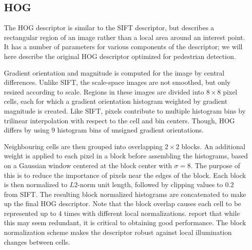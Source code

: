 \documentclass[thesis.tex]{subfiles}
\begin{document}
\subsection{HOG}
\label{sec:hog}

The HOG descriptor is similar to the SIFT descriptor, but describes a rectangular region of an image rather than a local area around an interest point. It has a number of parameters for various components of the descriptor; we will here describe the original HOG descriptor optimized for pedestrian detection.

Gradient orientation and magnitude is computed for the image by central differences. Unlike SIFT, the scale-space images are not smoothed, but only resized according to scale. Regions in these images are divided into $8 \times 8$ pixel cells, each for which a gradient orientation histogram weighted by gradient magnitude is created. Like SIFT, pixels contribute to multiple histogram bins by trilinear interpolation with respect to the cell and bin centers. Though, HOG differs by using 9 histogram bins of unsigned gradient orientations.

Neighbouring cells are then grouped into overlapping $2 \times 2$ blocks. An additional weight is applied to each pixel in a block before assembling the histograms, based on a Gaussian window centered at the block center with $\sigma = 8$. The purpose of this is to reduce the importance of pixels near the edges of the block. Each block is then normalized to $L2$-norm unit length, followed by clipping values to $0.2$ from SIFT. The resulting block normalized histograms are concatenated to make up the final HOG descriptor. Note that the block overlap causes each cell to be represented up to $4$ times with different local normalizations. \citet{dalal2005histograms} report that while this may seem redundant, it is critical to obtaining good performance. The block normalization scheme makes the descriptor robust against local illumination changes between cells.
\end{document}
